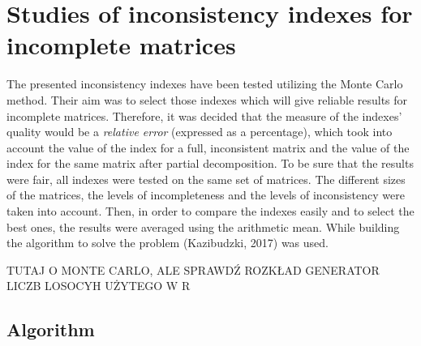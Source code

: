 \chapter{Studies of inconsistency indexes for incomplete matrices}
\label{sec:studiesOfInconsistencyIndexesForIncompleteMatrices}

The presented inconsistency indexes have been tested utilizing the Monte Carlo method. Their aim was to select those indexes which will give reliable results for incomplete matrices. Therefore, it was decided that the measure of the indexes' quality would be a \textit{relative error} (expressed as a percentage), which took into account the value of the index for a full, inconsistent matrix and the value of the index for the same matrix after partial decomposition. To be sure that the results were fair, all indexes were tested on the same set of matrices. The different sizes of the matrices, the levels of incompleteness and the levels of inconsistency were taken into account. Then, in order to compare the indexes easily and to select the best ones, the results were averaged using the arithmetic mean. While building the algorithm to solve the problem (Kazibudzki, 2017) was used.

TUTAJ O MONTE CARLO, ALE SPRAWDŹ ROZKŁAD GENERATOR LICZB LOSOCYH UŻYTEGO W R

\section{Algorithm}
